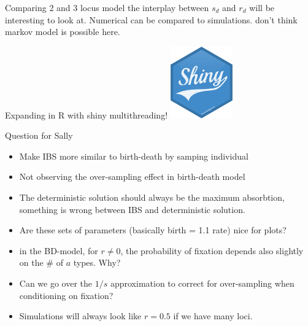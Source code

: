\documentclass{beamer}
\begin{document}
\begin{frame}{Comparing 2 and 3 locus model}
    the interplay between $s_d$ and $r_d$ will be interesting to look at. Numerical can be compared to simulations. don't think markov model is possible here.
\end{frame}

\begin{frame}{Expanding in R with shiny}
    multithreading! 
    \includegraphics[width=0.2\textwidth]{Figures/shiny-hex.png}
\end{frame}

\begin{frame}{Question for Sally}
\begin{itemize}
    \item Make IBS more similar to birth-death by samping individual 
    \item Not observing the over-sampling effect in birth-death model
    \item The deterministic solution should always be the maximum absorbtion, something is wrong between IBS and deterministic solution. 
    \item Are these sets of parameters (basically birth = 1.1 rate) nice for plots?
    \item in the BD-model, for $r\neq 0$, the probability of fixation depends also slightly on the \# of $a$ types. Why?
    \item Can we go over the $1/s$ approximation to correct for over-sampling when conditioning on fixation?
    \item Simulations will always look like $r=0.5$ if we have many loci.
\end{itemize}
    
\end{frame}
\end{document}
